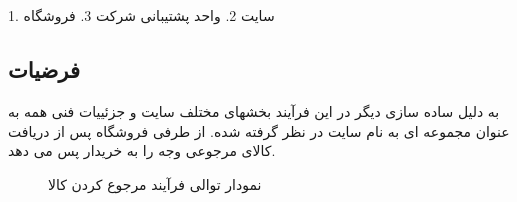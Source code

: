 \documentclass[12pt,onecolumn,a4paper]{article}
\begin{document}
\subsection{ }
1. سایت
2. واحد پشتیبانی شرکت
3. فروشگاه
\subsection{فرضیات }

به دلیل ساده سازی دیگر در این فرآیند بخشهای مختلف سایت و جزئییات فنی همه به عنوان مجموعه ای به نام سایت در نظر گرفته شده.
از طرفی فروشگاه پس از دریافت کالای مرجوعی وجه را به خریدار پس می دهد.

\newpage
\begin{figure}[!h]
\caption{نمودار توالی فرآیند مرجوع کردن کالا}\label{figpvb}
\end{figure}
\end{document}
